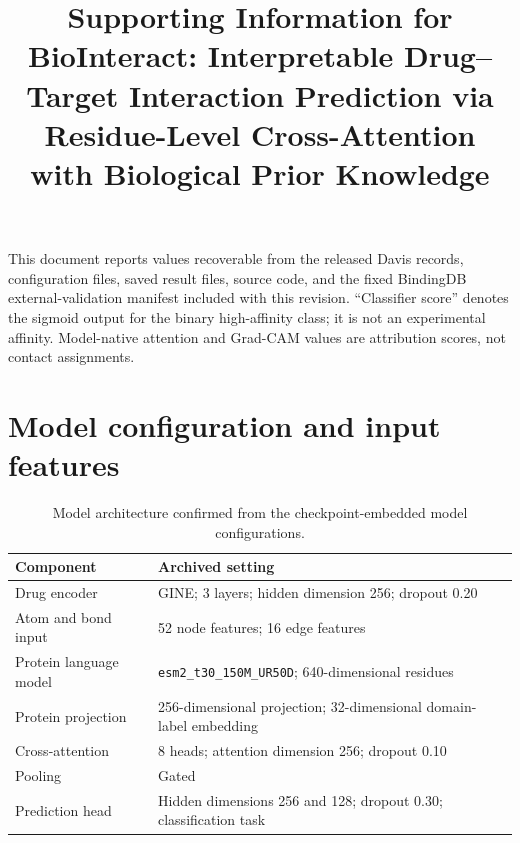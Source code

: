 \documentclass[11pt]{article}
\title{Supporting Information for\\
BioInteract: Interpretable Drug--Target Interaction Prediction via Residue-Level Cross-Attention with Biological Prior Knowledge}
\author{ }
\date{ }
\begin{document}
\maketitle

\noindent This document reports values recoverable from the released Davis
records, configuration files, saved result files, source code, and the fixed
BindingDB external-validation manifest included with this revision. ``Classifier
score'' denotes the sigmoid output for the binary high-affinity class; it is not
an experimental affinity. Model-native attention and Grad-CAM values are
attribution scores, not contact assignments.

\section*{Model configuration and input features}

\begin{table}[H]
\centering
\caption{Model architecture confirmed from the checkpoint-embedded model configurations.}
\begin{tabular}{ll}
\toprule
Component & Archived setting \\
\midrule
Drug encoder & GINE; 3 layers; hidden dimension 256; dropout 0.20 \\
Atom and bond input & 52 node features; 16 edge features \\
Protein language model & \texttt{esm2\_t30\_150M\_UR50D}; 640-dimensional residues \\
Protein projection & 256-dimensional projection; 32-dimensional domain-label embedding \\
Cross-attention & 8 heads; attention dimension 256; dropout 0.10 \\
Pooling & Gated \\
Prediction head & Hidden dimensions 256 and 128; dropout 0.30; classification task \\
\bottomrule
\end{tabular}
\end{table}
\end{document}
